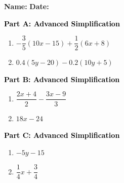 \documentclass[12pt, letterpaper, fleqn]{article}
\begin{document}
\textbf{Name:} \underline{\hspace{5cm}}
\hfill
\textbf{Date:} \underline{\hspace{3cm}}\\

\begin{tcolorbox}[colback=customteal!20]
\large\textcolor{black}{\textbf{Part A: Advanced Simplification}}
\end{tcolorbox}

\vspace{3mm}

\begin{enumerate}[itemsep=5.5cm, leftmargin=0.6cm]
\item $-\dfrac{3}{5}\left(10x - 15\right) + \dfrac{1}{2}\left(6x + 8\right)$
\item $0.4(5y - 20) - 0.2(10y + 5)$
\end{enumerate}

\newpage

\begin{tcolorbox}[colback=customteal!20]
\large\textcolor{black}{\textbf{Part B: Advanced Simplification}}
\end{tcolorbox}

\vspace{3mm}

\begin{enumerate}[itemsep=5.5cm, leftmargin=0.6cm, resume]
\item $\dfrac{2x + 4}{2} - \dfrac{3x - 9}{3}$
\item $18x - 24$
\end{enumerate}

\newpage

\begin{tcolorbox}[colback=customteal!20]
\large\textcolor{black}{\textbf{Part C: Advanced Simplification}}
\end{tcolorbox}

\vspace{3mm}

\begin{enumerate}[itemsep=5.5cm, leftmargin=0.6cm, resume]
\item $-5y - 15$
\item $\dfrac{1}{4}x + \dfrac{3}{4}$
\end{enumerate}
\end{document}
